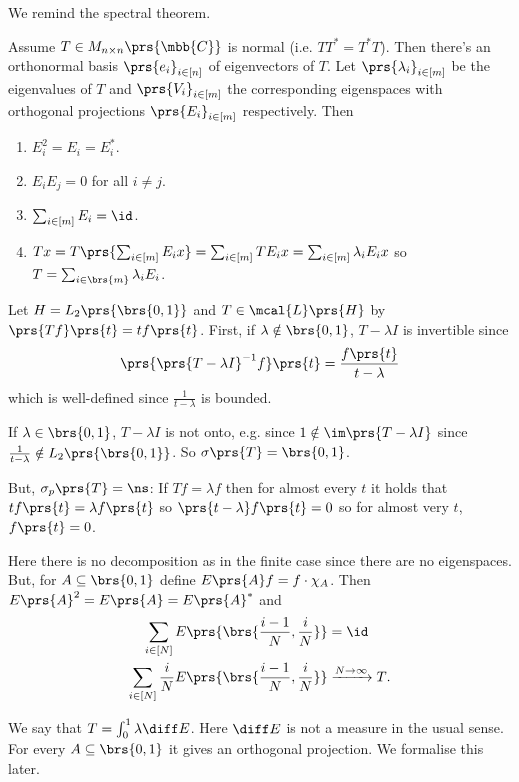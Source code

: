 \documentclass[10pt, twoside]{book}
\begin{document}
We remind the spectral theorem.

\begin{theorem}
Assume $T \in M_{n \times n}\prs{\mbb{C}}$ is normal (i.e. $T T^* = T^* T$).
Then there's an orthonormal basis $\prs{e_i}_{i \in [n]}$ of eigenvectors of $T$.
Let $\prs{\lambda_i}_{i \in [m]}$ be the eigenvalues of $T$ and $\prs{V_i}_{i \in [m]}$ the corresponding eigenspaces with orthogonal projections $\prs{E_i}_{i \in [m]}$ respectively.
Then
\begin{enumerate}
\item $E_i^2 = E_i = E_i^*$.
\item $E_i E_j = 0$ for all $i \neq j$.
\item $\sum_{i \in [m]} E_i = \id$.
\item $T x = T \prs{\sum_{i \in [m]} E_i x} = \sum_{i \in [m]} T E_i x = \sum_{i \in [m]} \lambda_i E_i x$ so $T = \sum_{i \in \brs{m}} \lambda_i E_i$.
\end{enumerate}
\end{theorem}

\begin{example}
Let $H = L_2\prs{\brs{0,1}}$ and $T \in \mcal{L}\prs{H}$ by $\prs{Tf}\prs{t} = t f\prs{t}$.
First, if $\lambda \notin \brs{0,1}$, $T-\lambda I$ is invertible since
\[\prs{\prs{T - \lambda I}^{-1} f}\prs{t} = \frac{f\prs{t}}{t-\lambda}\]
which is well-defined since $\frac{1}{t - \lambda}$ is bounded.

If $\lambda \in \brs{0,1}$, $T - \lambda I$ is not onto, e.g. since $1 \notin \im\prs{T-\lambda I}$ since $\frac{1}{t-\lambda} \notin L_2\prs{\brs{0,1}}$. So $\sigma\prs{T} = \brs{0,1}$.

But, $\sigma_p\prs{T} = \ns$: If $Tf = \lambda f$ then for almost every $t$ it holds that $t f\prs{t} = \lambda f\prs{t}$ so $\prs{t-\lambda} f\prs{t} = 0$ so for almost very $t$, $f\prs{t} = 0$.

Here there is no decomposition as in the finite case since there are no eigenspaces.
But, for $A \subseteq \brs{0,1}$ define $E\prs{A} f = f \cdot \chi_A$. Then $E\prs{A}^2 = E\prs{A} =  E\prs{A}^*$ and
\begin{align*}
\sum_{i \in [N]} E\prs{\brs{\frac{i-1}{N}, \frac{i}{N}}} &= \id \\
\sum_{i \in [N]} \frac{i}{N} E\prs{\brs{\frac{i-1}{N}, \frac{i}{N}}} &\xrightarrow{N\to\infty} T \text{.}
\end{align*}

We say that $T = \int_0^1 \lambda \diff E$. Here $\diff E$ is not a measure in the usual sense. For every $A \subseteq \brs{0,1}$ it gives an orthogonal projection. We formalise this later.
\end{example}
\end{document}
